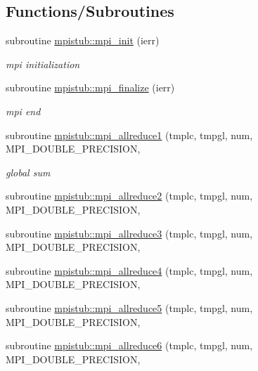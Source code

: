 \subsection*{Functions/\+Subroutines}
\begin{DoxyCompactItemize}
\item 
subroutine \mbox{\hyperlink{namespacempistub_af6819ee02570b8c8bef94e79e67a4af9}{mpistub\+::mpi\+\_\+init}} (ierr)
\begin{DoxyCompactList}\small\item\em mpi initialization \end{DoxyCompactList}\item 
subroutine \mbox{\hyperlink{namespacempistub_a6a6bc8ca0a832b3f53660407ed51302d}{mpistub\+::mpi\+\_\+finalize}} (ierr)
\begin{DoxyCompactList}\small\item\em mpi end \end{DoxyCompactList}\item 
subroutine \mbox{\hyperlink{namespacempistub_a500688889ac1b249a828fab59a1f8b5e}{mpistub\+::mpi\+\_\+allreduce1}} (tmplc, tmpgl, num, M\+P\+I\+\_\+\+D\+O\+U\+B\+L\+E\+\_\+\+P\+R\+E\+C\+I\+S\+I\+ON,
\begin{DoxyCompactList}\small\item\em global sum \end{DoxyCompactList}\item 
subroutine \mbox{\hyperlink{namespacempistub_a8d115cae5e65c2a2bc7679f25da7b08a}{mpistub\+::mpi\+\_\+allreduce2}} (tmplc, tmpgl, num, M\+P\+I\+\_\+\+D\+O\+U\+B\+L\+E\+\_\+\+P\+R\+E\+C\+I\+S\+I\+ON,
\item 
subroutine \mbox{\hyperlink{namespacempistub_a4193e72879e62788a983d1c7e73ff08c}{mpistub\+::mpi\+\_\+allreduce3}} (tmplc, tmpgl, num, M\+P\+I\+\_\+\+D\+O\+U\+B\+L\+E\+\_\+\+P\+R\+E\+C\+I\+S\+I\+ON,
\item 
subroutine \mbox{\hyperlink{namespacempistub_ad0b3b8a56320b07ec24fdf1a6d012614}{mpistub\+::mpi\+\_\+allreduce4}} (tmplc, tmpgl, num, M\+P\+I\+\_\+\+D\+O\+U\+B\+L\+E\+\_\+\+P\+R\+E\+C\+I\+S\+I\+ON,
\item 
subroutine \mbox{\hyperlink{namespacempistub_a1d326fcb72261d5c91c9f31bfdeae961}{mpistub\+::mpi\+\_\+allreduce5}} (tmplc, tmpgl, num, M\+P\+I\+\_\+\+D\+O\+U\+B\+L\+E\+\_\+\+P\+R\+E\+C\+I\+S\+I\+ON,
\item 
subroutine \mbox{\hyperlink{namespacempistub_a3a34d1b95074e43d0c79295326059ef2}{mpistub\+::mpi\+\_\+allreduce6}} (tmplc, tmpgl, num, M\+P\+I\+\_\+\+D\+O\+U\+B\+L\+E\+\_\+\+P\+R\+E\+C\+I\+S\+I\+ON,

\end{DoxyCompactItemize}
